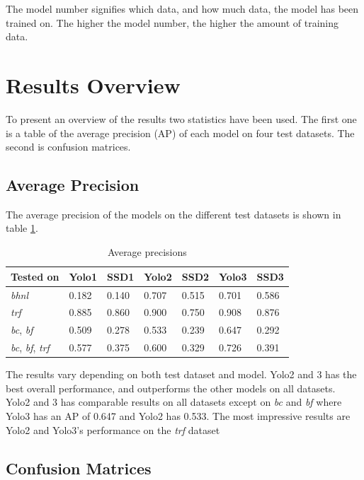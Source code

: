 \vspace{3mm}

The model number signifies which data, and how much data, the model has been trained on. The higher the model number, the higher the amount of training data.


\section{Results Overview}

To present an overview of the results two statistics have been used. The first one is a table of the average precision (AP) of each model on four test datasets. The second is confusion matrices. 

\subsection{Average Precision}

The average precision of the models on the different test datasets is shown in table \ref{ap_tab}. 

\begin{table}[h!]
\centering
\begin{tabular}{l|ll|ll|ll}
Tested on   & Yolo1 & SSD1  & Yolo2 & SSD2  & Yolo3 & SSD3  \\ \hline
\textit{bhnl}        & 0.182 & 0.140 & 0.707 & 0.515 & 0.701 & 0.586 \\
\textit{trf}         & 0.885 & 0.860 & 0.900 & 0.750 & 0.908 & 0.876 \\
\textit{bc}, \textit{bf}      & 0.509 & 0.278 & 0.533 & 0.239 & 0.647 & 0.292 \\
\textit{bc}, \textit{bf}, \textit{trf} & 0.577 & 0.375 & 0.600 & 0.329 & 0.726 & 0.391
\end{tabular}
\caption{Average precisions}
\label{ap_tab}
\end{table}

The results vary depending on both test dataset and model. Yolo2 and 3 has the best overall performance, and outperforms the other models on all datasets. Yolo2 and 3 has comparable results on all datasets except on \textit{bc} and \textit{bf} where Yolo3 has an AP of 0.647 and Yolo2 has 0.533. The most impressive results are Yolo2 and Yolo3's performance on the \textit{trf} dataset


\subsection{Confusion Matrices}

